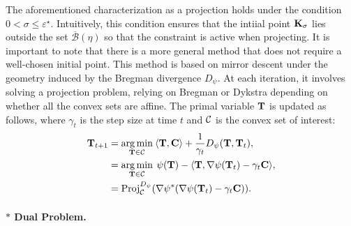 \begin{remark}
    The aforementioned characterization as a projection holds under the condition $0 < \sigma \leq \varepsilon^\star$. Intuitively, this condition ensures that the intiial point ${\mathbf{K}}_\sigma$ lies outside the set $\overline{\mathcal{B}}(\eta)$ so that the constraint is active when projecting.
    It is important to note that there is a more general method that does not require a well-chosen initial point. This method is based on mirror descent under the geometry induced by the Bregman divergence $D_\psi$. At each iteration, it involves solving a projection problem, relying on Bregman or Dykstra depending on whether all the convex sets are affine. The primal variable ${\mathbf{T}}$ is updated as follows, where $\gamma_t$ is the step size at time $t$ and ${\mathcal{C}}$ is the convex set of interest:
    \begin{align}
    {\mathbf{T}}_{t+1} &= \operatorname*{arg\,min}_{{\mathbf{T}} \in {\mathcal{C}}} \: \langle {\mathbf{T}}, {\mathbf{C}} \rangle + \frac{1}{\gamma_t} D_{\psi}({\mathbf{T}}, {\mathbf{T}}_t), \\
    &= \operatorname*{arg\,min}_{{\mathbf{T}} \in {\mathcal{C}}} \: \psi({\mathbf{T}}) - \langle {\mathbf{T}}, \nabla \psi({\mathbf{T}}_t) - \gamma_t {\mathbf{C}} \rangle, \\
    &= \operatorname{Proj}^{D_\psi}_{{\mathcal{C}}}(\nabla \psi^*(\nabla \psi({\mathbf{T}}_t) - \gamma_t {\mathbf{C}})).
    \end{align}
\end{remark}    


\paragraph{$\ast$ Dual Problem.}

